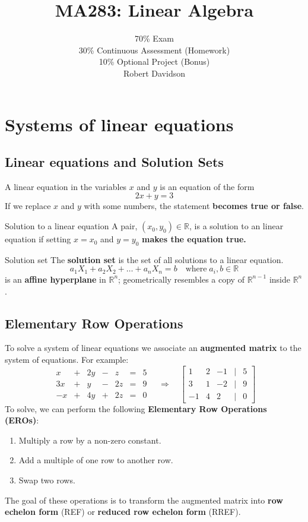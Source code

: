 \documentclass[a4paper, 9pt]{extarticle}
\title{
\textbf{MA283: Linear Algebra} \\ 
}
\author{
  70\% Exam\\
30\% Continuous Assessment (Homework) \\
10\% Optional Project (Bonus)\\ [2ex]
Robert Davidson
}
\date{}       %
\begin{document}
\maketitle
\pagebreak

\tableofcontents
\pagebreak
\section{Systems of linear equations}
\subsection{Linear equations and Solution Sets}
A linear equation in the variables $x$ and
$y$ is an equation of the form
\begin{equation*}
  2x + y = 3
\end{equation*}
If we replace $x$ and $y$ with some numbers, the statement \textbf{becomes true or false}.

\begin{definitionbox}{Solution to a linear equation}{}
  A pair, $(x_0, y_0) \in \mathbb{R}$, is a solution to an linear equation if setting $x = x_0$ and $y = y_0$ \textbf{makes the equation true.}
\end{definitionbox}

\begin{definitionbox}{Solution set}{}
  The \textbf{solution set} is the set of all solutions to a linear equation.
  $$a_1X_1 + a_2X_2 + \ldots + a_nX_n = b \quad \text{where} \; a_i, b \in \mathbb{R}$$
  is an \textbf{affine hyperplane} in $\mathbb{R}^n$; geometrically resembles a copy of $\mathbb{R}^{n-1}$ inside $\mathbb{R}^n$.
\end{definitionbox}
\subsection{Elementary Row Operations}
To solve a system of linear equations we associate an \textbf{augmented matrix} to the system of equations. For example:
$$
  \begin{array}
    {ccccccc}x & + & 2y & - & z  & = & 5 \\
    3x         & + & y  & - & 2z & = & 9 \\
    -x         & + & 4y & + & 2z & = & 0
  \end{array}
  \quad \Rightarrow \quad
  \begin{bmatrix}
    1  & 2 & -1 & | & 5 \\
    3  & 1 & -2 & | & 9 \\
    -1 & 4 & 2  & | & 0
  \end{bmatrix}
$$
To solve, we can perform the following \textbf{Elementary Row Operations (EROs)}:
\begin{enumerate}
  \item Multiply a row by a non-zero constant.
  \item Add a multiple of one row to another row.
  \item Swap two rows.
\end{enumerate}
The goal of these operations is to transform the augmented matrix into \textbf{row echelon form} (REF) or \textbf{reduced row echelon form} (RREF).
\end{document}

